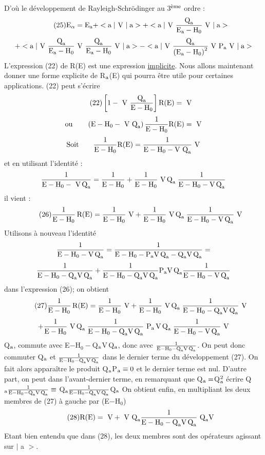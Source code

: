 D'où le développement de Rayleigh-Schrödinger au 3$^{\text{ème}}$ ordre :
\[
\tag{25}\text{E}_\alpha=\text{E}_{\text{a}}+<\text{a}\;|\text{ V }|\;\text{a}>+<\text{a}\;|\text{ V }\frac{\text{Q}_{\text{a}}}{\text{E}_{\text{a}}-\text{H}_0}\text{ V }|\;\text{a}>
\]
\[
+<\text{a}\;|\text{ V }\frac{\text{Q}_{\text{a}}}{\text{E}_{\text{a}}-\text{H}_0}\text{ V }\frac{\text{Q}_{\text{a}}}{\text{E}_{\text{a}}-\text{H}_0}\text{ V }|\;\text{a}>-<\text{a}\;|\text{ V }\frac{\text{Q}_{\text{a}}}{\left(\text{E}_{\text{a}}-\text{H}_0\right)^2}\text{ V P}_{\text{a}}\text{ V }|\;\text{a}>
\]
L'expression (22) de R(E) est une expression \ul{implicite}. Nous allons maintenant
donner une forme explicite de R$_{\text{a}}$(E) qui pourra être utile pour certaines applications. (22) peut s'écrire
\[
\tag{22}\left[1-\text{ V }\frac{\text{Q}_{\text{a}}}{\text{E}-\text{H}_0}\right]\text{R(E)}=\text{ V}
\]
\[
\text{ou}\qquad\left(\text{E}-\text{H}_0-\text{ V Q}_{\text{a}}\right)\frac{1}{\text{E}-\text{H}_0}\text{R(E)}=\text{ V}
\]
\[
\text{Soit}\qquad\frac{1}{\text{E}-\text{H}_0}\text{R(E)}=\frac{1}{\text{E}-\text{H}_0-\text{V Q}_{\text{a}}}\text{ V}
\]
et en utilisant l'identité :
\[
\frac{1}{\text{E}-\text{H}_0-\text{ V\,Q}_{\text{a}}}=\frac{1}{\text{E}-\text{H}_0}+
\frac{1}{\text{E}-\text{H}_0}\text{ V\,Q}_{\text{a }}\frac{1}{\text{E}-\text{H}_0-\text{V\,Q}_{\text{a}}}
\]
il vient :
\[
\tag{26}\frac{1}{\text{E}-\text{H}_0}\,\text{R(E)}=\frac{1}{\text{E}-\text{H}_0}\text{ V}+\frac{1}{\text{E}-\text{H}_0}\text{ V\,Q}_{\text{a }}\frac{1}{\text{E}-\text{H}_0-\text{V\,Q}_{\text{a}}}\text{ V}
\]
Utilisons à nouveau l'identité
\[
\frac{1}{\text{E}-\text{H}_0-\text{V\,Q}_{\text{a}}}
=\frac{1}{\text{E}-\text{H}_0-\text{P}_{\text{a}}\text{V\,Q}_{\text{a}}-\text{Q}_{\text{a}}\text{V\,Q}_{\text{a}}}=
\]
\[
\frac{1}{\text{E}-\text{H}_0-\text{Q}_{\text{a}}\text{V\,Q}_{\text{a}}}
+\frac{1}{\text{E}-\text{H}_0-\text{Q}_{\text{a}}\text{V\,Q}_{\text{a}}}\text{P}_{\text{a}}\text{V\,Q}_{\text{a}}
\frac{1}{\text{E}-\text{H}_0-\text{V\,Q}_{\text{a}}}
\]
dans l'expression (26); on obtient
\[
\tag{27}\frac{1}{\text{E}-\text{H}_0}\,\text{R(E)}=\frac{1}{\text{E}-\text{H}_0}\text{ V}+
\frac{1}{\text{E}-\text{H}_0}\text{ V\,Q}_{\text{a }}\frac{1}{\text{E}-\text{H}_0-\text{Q}_{\text{a}}\text{V\,Q}_{\text{a}}}\text{ V}
\]
\[
+\frac{1}{\text{E}-\text{H}_0}\text{ V\,Q}_{\text{a }}
\frac{1}{\text{E}-\text{H}_0-\text{Q}_{\text{a}}\text{V\,Q}_{\text{a}}}\text{ P}_{\text{a}}\text{\,V\,Q}_{\text{a }}
\frac{1}{\text{E}-\text{H}_0-\text{V\,Q}_{\text{a}}}\text{ V}
\]
Q$_{\text{a}}$, commute avec E$-$H$_0-$Q$_{\text{a}}$V\,Q$_{\text{a}}$, 
donc avec $\frac{1}{\text{E}-\text{H}_0-\text{Q}_{\text{a}}\text{V\,Q}_{\text{a}}}$.
On peut donc commuter Q$_{\text{a}}$ et $\frac{1}{\text{E}-\text{H}_0-\text{Q}_{\text{a}}\text{V\,Q}_{\text{a}}}$ dans le dernier terme du
développement (27). On fait alors apparaître le produit Q$_{\text{a}}$P$_{\text{a}}\equiv0$ et le dernier terme est nul.
D'autre part, on peut dans l'avant-dernier terme, en remarquant que Q$_{\text{a}}=$Q$_{\text{a}}^2$ écrire
Q$_{\text{a}}\frac{1}{\text{E}-\text{H}_0-\text{Q}_{\text{a}}\text{V\,Q}_{\text{a}}}\equiv$ Q$_{\text{a}}
\frac{1}{\text{E}-\text{H}_0-\text{Q}_{\text{a}}\text{V\,Q}_{\text{a}}}$Q$_{\text{a}}$
On obtient enfin, en multipliant les deux membres de (27) à gauche par (E$-$H$_0$)
\[
\tag{28}\text{R(E)}=\text{ V}+\text{ V Q}_{\text{a}}\frac{1}{\text{E}-\text{H}_0-\text{Q}_{\text{a}}\text{V\,Q}_{\text{a}}}\text{ Q}_{\text{a}}\text{V}
\]
Etant bien entendu que dans (28), les deux membres sont des opérateurs agissant sur $|$ a $>$.

